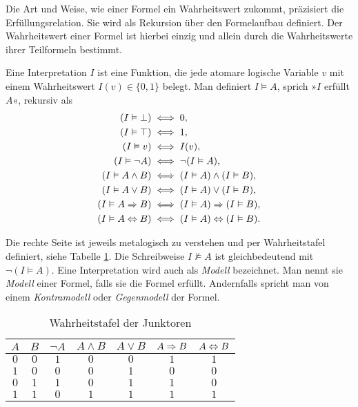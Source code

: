 Die Art und Weise, wie einer Formel ein Wahrheitswert zukommt,
präzisiert die Erfüllungsrelation. Sie wird als Rekursion über den
Formelaufbau definiert. Der Wahrheitswert einer Formel ist hierbei
einzig und allein durch die Wahrheitswerte ihrer Teilformeln bestimmt.

\begin{Definition}[Erfüllungsrelation]\label{def:sat}\newlinefirst
Eine Interpretation $I$ ist eine Funktion, die jede atomare logische
Variable $v$ mit einem Wahrheitswert $I(v)\in\{0,1\}$ belegt.
Man definiert $I\models A$, sprich »$I$ erfüllt $A$«, rekursiv als
\begin{align*}
(I\vDash\bot) &\iff 0,\\
(I\vDash\top) &\iff 1,\\
(I\vDash v) &\iff I(v),\\
(I\vDash\lnot A) &\iff \lnot (I\vDash A),\\
(I\vDash A\land B) &\iff (I\vDash A)\land (I\vDash B),\\
(I\vDash A\lor B) &\iff (I\vDash A)\lor (I\vDash B),\\
(I\vDash A\Rightarrow B) &\iff (I\vDash A)\Rightarrow (I\vDash B),\\
(I\vDash A\Leftrightarrow B) &\iff (I\vDash A)\Leftrightarrow (I\vDash B).
\end{align*}
\end{Definition}
Die rechte Seite ist jeweils metalogisch zu verstehen und per
Wahrheitstafel definiert, siehe Tabelle \ref{tab:Junktoren}.
Die Schreibweise $I\nvDash A$ ist gleichbedeutend mit
$\lnot (I\models A)$. Eine Interpretation wird auch als \emph{Modell}
bezeichnet. Man nennt sie \emph{Modell} einer Formel, falls sie die
Formel erfüllt. Andernfalls spricht man von einem \emph{Kontramodell}
oder \emph{Gegenmodell} der Formel.

\begin{table}
\caption{Wahrheitstafel der Junktoren}
\label{tab:Junktoren}
\centering
\begin{tabular}{cc@{\qquad}c@{\qquad}c@{\qquad}c@{\qquad}c@{\qquad}c}
\toprule
$A$ & $B$ & $\lnot A$ & $A\land B$ & $A\lor B$ & $A\Rightarrow B$ & $A\Leftrightarrow B$\\
\midrule[\heavyrulewidth]
$0$ & $0$ & $1$ & $0$ & $0$ & $1$ & $1$\\
$1$ & $0$ & $0$ & $0$ & $1$ & $0$ & $0$\\
$0$ & $1$ & $1$ & $0$ & $1$ & $1$ & $0$\\
$1$ & $1$ & $0$ & $1$ & $1$ & $1$ & $1$\\
\bottomrule
\end{tabular}
\end{table}

